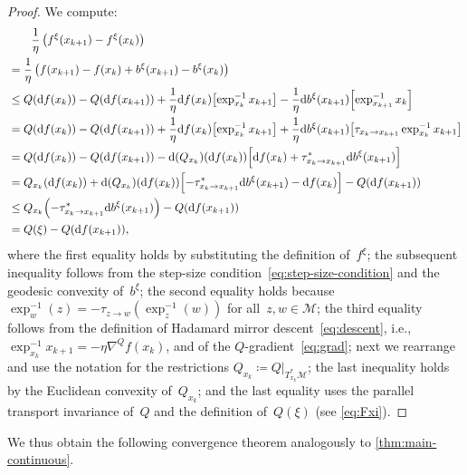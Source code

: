 \documentclass[11pt,letterpaper]{article}
\numberwithin{equation}{section}
\newcommand{\diff}{\mathrm{d}}
\newcommand{\MM}{\mathcal{M}}
\begin{document}
\begin{proof}
We compute:
\begin{align*}
&\qquad \frac1\eta \left( f^\xi(x_{k+1}) - f^\xi(x_k) \right) \\
&= \frac1\eta \left( f(x_{k+1}) - f(x_k) + b^\xi(x_{k+1}) - b^\xi(x_k) \right) \\
&\leq Q(\diff f(x_k)) - Q(\diff f(x_{k+1})) + \frac1\eta \diff f(x_k)\mleft[\exp_{x_k}^{-1}x_{k+1}\mright]
    - \frac1\eta \diff b^\xi(x_{k+1})\mleft[\exp_{x_{k+1}}^{-1}x_k\mright] \\
&= Q(\diff f(x_k)) - Q(\diff f(x_{k+1})) + \frac1\eta \diff f(x_k)\mleft[\exp_{x_k}^{-1}x_{k+1}\mright]
    + \frac1\eta \diff b^\xi(x_{k+1})\mleft[\tau_{x_k\to x_{k+1}} \exp_{x_k}^{-1}x_{k+1}\mright] \\
&= Q(\diff f(x_k)) - Q(\diff f(x_{k+1})) - \diff(Q_{x_k})(\diff f(x_k))\mleft[ \diff f(x_k) + \tau_{x_k\to x_{k+1}}^* \diff b^\xi(x_{k+1}) \mright] \\
&= Q_{x_k}(\diff f(x_k)) + \diff(Q_{x_k})(\diff f(x_k))\mleft[-\tau^*_{x_k\to x_{k+1}}\diff b^\xi(x_{k+1})-\diff f(x_k)\mright] - Q(\diff f(x_{k+1})) \\
&\leq Q_{x_k}\mleft(- \tau^*_{x_k\to x_{k+1}}\diff b^\xi(x_{k+1})\mright) - Q(\diff f(x_{k+1})) \\
&= Q(\xi) - Q(\diff f(x_{k+1})),
\end{align*}
where the first equality holds by substituting the definition of~$f^\xi$;
the subsequent inequality follows from the step-size condition~\eqref{eq:step-size-condition} and the geodesic convexity of~$b^\xi$;
the second equality holds because $\exp_w^{-1}(z) = -\tau_{z\to w}(\exp_z^{-1}(w))$ for all~$z,w \in \MM$;
the third equality follows from the definition of Hadamard mirror descent~\eqref{eq:descent}, i.e., $\exp_{x_k}^{-1}x_{k+1} = -\eta \nabla^Q f(x_k)$, and of the $Q$-gradient~\eqref{eq:grad};
next we rearrange and use the notation for the restrictions $Q_{x_k} \coloneqq Q|_{T_{x_k}^*\MM}$;
the last inequality holds by the Euclidean convexity of~$Q_{x_k}$;
and the last equality uses the parallel transport invariance of~$Q$ and the definition of~$Q(\xi)$ (see \cref{eq:Fxi}).
\end{proof}

We thus obtain the following convergence theorem analogously to \cref{thm:main-continuous}.
\end{document}
